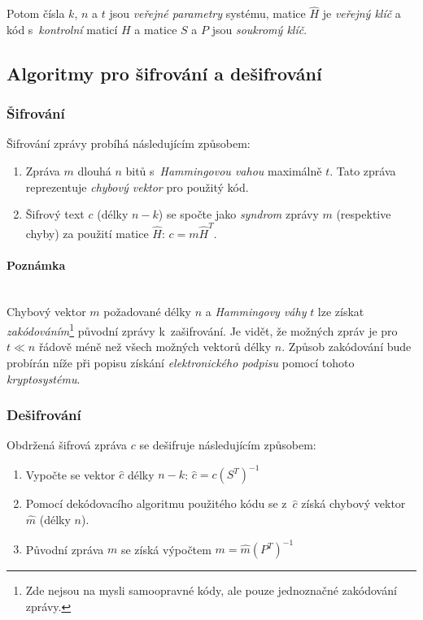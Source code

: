 \documentclass[thesis=M,czech,hidelinks]{FITthesis}[2012/06/26]
\newcommand{\0}{{\textcolor[gray]{0.80}{0}}}
\begin{document}
Potom čísla $k$, $n$ a $t$ jsou \emph{veřejné parametry} systému, matice
$\hat{H}$ je \emph{veřejný klíč} a kód s~\emph{kontrolní} maticí $H$ a matice
$S$ a $P$ jsou \emph{soukromý klíč}.


\subsection{Algoritmy pro šifrování a dešifrování}
\subsubsection{Šifrování}
Šifrování zprávy probíhá následujícím způsobem:
\begin{enumerate}
    \item Zpráva $m$ dlouhá $n$ bitů s~\emph{Hammingovou vahou} maximálně $t$.
        Tato zpráva reprezentuje \emph{chybový vektor} pro použitý kód.
    \item Šifrový text $c$ (délky $n-k$) se spočte jako \emph{syndrom} zprávy
        $m$ (respektive chyby) za použití matice $\hat{H}$: $c = m \hat{H}^T$.
\end{enumerate}

\paragraph{Poznámka} \hfil \\
Chybový vektor $m$ požadované délky $n$ a \emph{Hammingovy váhy} $t$ lze
získat \emph{zakódováním}\footnote{
    Zde nejsou na mysli samoopravné kódy, ale pouze jednoznačné zakódování
    zprávy.
} původní zprávy k~zašifrování. Je vidět, že možných zpráv je pro $t \ll n$
řádově méně než všech možných vektorů délky $n$. Způsob zakódování bude probírán
níže při popisu získání \emph{elektronického podpisu} pomocí tohoto
\emph{kryptosystému}.



\subsubsection{Dešifrování}
Obdržená šifrová zpráva $c$ se dešifruje následujícím způsobem:
\begin{enumerate}
    \item Vypočte se vektor $\hat{c}$ délky $n-k$:
        $\hat{c} = c \left(S^T\right)^{-1} $
    \item Pomocí dekódovacího algoritmu použitého kódu se z~$\hat{c}$ získá
        chybový vektor $\hat{m}$ (délky $n$).
    \item Původní zpráva $m$ se získá výpočtem
        $m = \hat{m} \left(P^T\right)^{-1}$
\end{enumerate}
\end{document}
